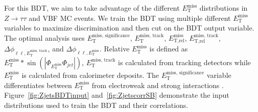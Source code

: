 For this BDT, we aim to take advantage of the different $E_{\text{T}}^{\text{miss}}$ distributions in $Z\rightarrow\tau\tau$ and VBF MC events. We train the BDT using multiple different $E_{\text{T}}^{\text{miss}}$ variables to maximize discrimination and then cut on the BDT output variable. The optimal analysis uses $\ensuremath{E_{\text{T}}^{\text{miss, significance}}}$, $\ensuremath{E_{\text{T}}^{\text{miss, track}}}$, $\ensuremath{E_{\text{T,rel}}^{\text{miss}}}$, $\ensuremath{E_{\text{T,rel}}^{\text{miss, track}}}$, $\ensuremath{\Delta\phi_{\ell\ell,E_{\text{T}}^{\text{miss, track}}}}$, and $\ensuremath{\Delta\phi_{\ell\ell,E_{\text{T}}^{\text{miss}}}}$. Relative $E_{\text{T}}^{\text{miss}}$ is defined as $E_{\text{T}}^{\text{miss}} * \sin(|\Phi_{E_{\text{T}}^{\text{miss}}}\Phi_{jet}|)$, $\ensuremath{E_{\text{T}}^{\text{miss, track}}}$ is calculated from tracking detectors while $E_{\text{T}}^{\text{miss}}$ is calculated from calorimeter deposits. The $\ensuremath{E_{\text{T}}^{\text{miss, significance}}}$ variable differentiates between $E_{\text{T}}^{\text{miss}}$ from electroweak and strong interactions \cite{JETEtmiss}. Figure~\ref{fig:ZjetsBDTinput} and~\ref{fig:ZjetscorrSB} demonstrate the input distributions used to train the BDT and their correlations.

